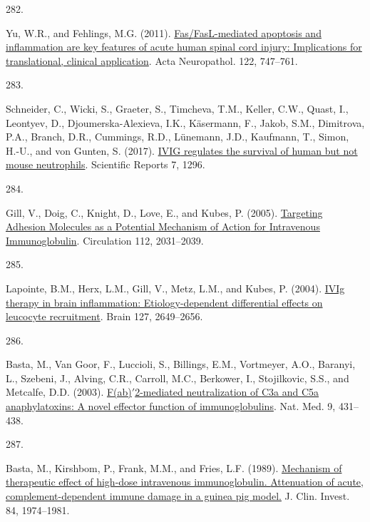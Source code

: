 \documentclass[
]{article}
\newlength{\cslhangindent}
\newlength{\csllabelwidth}
\newlength{\cslentryspacingunit} %
\newenvironment{CSLReferences}[2] %
 {%
  \setlength{\parindent}{0pt}
  \ifodd #1
  \let\oldpar\par
  \def\par{\hangindent=\cslhangindent\oldpar}
  \fi
  \setlength{\parskip}{#2\cslentryspacingunit}
 }%
 {}
\newcommand{\CSLLeftMargin}[1]{\parbox[t]{\csllabelwidth}{#1}}
\newcommand{\CSLRightInline}[1]{\parbox[t]{\linewidth - \csllabelwidth}{#1}\break}
\begin{document}
\begin{CSLReferences}{0}{0}
\leavevmode{}%
\CSLLeftMargin{282. }
\CSLRightInline{Yu, W.R., and Fehlings, M.G. (2011). \href{https://doi.org/10.1007/s00401-011-0882-3}{Fas/{FasL-mediated} apoptosis and inflammation are key features of acute human spinal cord injury: Implications for translational, clinical application}. Acta Neuropathol. 122, 747--761.}

\leavevmode{}%
\CSLLeftMargin{283. }
\CSLRightInline{Schneider, C., Wicki, S., Graeter, S., Timcheva, T.M., Keller, C.W., Quast, I., Leontyev, D., Djoumerska-Alexieva, I.K., Käsermann, F., Jakob, S.M., Dimitrova, P.A., Branch, D.R., Cummings, R.D., Lünemann, J.D., Kaufmann, T., Simon, H.-U., and von Gunten, S. (2017). \href{https://doi.org/10.1038/s41598-017-01404-0}{{IVIG} regulates the survival of human but not mouse neutrophils}. Scientific Reports 7, 1296.}

\leavevmode{}%
\CSLLeftMargin{284. }
\CSLRightInline{Gill, V., Doig, C., Knight, D., Love, E., and Kubes, P. (2005). \href{https://doi.org/10.1161/CIRCULATIONAHA.105.546150}{Targeting {Adhesion Molecules} as a {Potential Mechanism} of {Action} for {Intravenous Immunoglobulin}}. Circulation 112, 2031--2039.}

\leavevmode{}%
\CSLLeftMargin{285. }
\CSLRightInline{Lapointe, B.M., Herx, L.M., Gill, V., Metz, L.M., and Kubes, P. (2004). \href{https://doi.org/10.1093/brain/awh297}{{IVIg} therapy in brain inflammation: Etiology-dependent differential effects on leucocyte recruitment}. Brain 127, 2649--2656.}

\leavevmode{}%
\CSLLeftMargin{286. }
\CSLRightInline{Basta, M., Van Goor, F., Luccioli, S., Billings, E.M., Vortmeyer, A.O., Baranyi, L., Szebeni, J., Alving, C.R., Carroll, M.C., Berkower, I., Stojilkovic, S.S., and Metcalfe, D.D. (2003). \href{https://doi.org/10.1038/nm836}{F(ab){\({'}\)}2-mediated neutralization of {C3a} and {C5a} anaphylatoxins: A novel effector function of immunoglobulins}. Nat. Med. 9, 431--438.}

\leavevmode{}%
\CSLLeftMargin{287. }
\CSLRightInline{Basta, M., Kirshbom, P., Frank, M.M., and Fries, L.F. (1989). \href{https://doi.org/10.1172/JCI114387}{Mechanism of therapeutic effect of high-dose intravenous immunoglobulin. {Attenuation} of acute, complement-dependent immune damage in a guinea pig model.} J. Clin. Invest. 84, 1974--1981.}


\end{CSLReferences}
\end{document}
